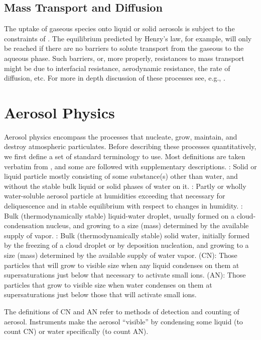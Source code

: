 \documentclass[12pt,twoside]{book}
\begin{document}
\section{Mass Transport and Diffusion}
The uptake of gaseous species onto liquid or solid aerosols is subject
to the constraints of .
The equilibrium predicted by Henry's law, for example, will only be
reached if there are no barriers to solute transport from the gaseous
to the aqueous phase. 
Such barriers, or, more properly, resistances to mass transport might
be due to interfacial resistance, aerodynamic resistance, the rate
of diffusion, etc.
For more in depth discussion of these processes see, e.g.,
\cite{Sch86,LeC91,SeP97,JPL97}. 

\chapter{Aerosol Physics}\label{sxn:aer}
Aerosol physics encompass the processes that nucleate, grow, maintain,
and destroy atmospheric particulates.
Before describing these processes quantitatively, we first define 
a set of standard terminology to use.
Most definitions are taken verbatim from \cite{Val85}, and some are
followed with supplementary descriptions.
: Solid or liquid particle mostly
consisting of some substance(s) other than water, and without the
stable bulk liquid or solid phases of water on it.
: Partly or wholly water-soluble aerosol
particle at humidities exceeding that necessary for deliquescence and
in stable equilibrium with respect to changes in humidity.
: Bulk (thermodynamically stable) liquid-water
droplet, usually formed on a cloud-condensation nucleus, and growing
to a size (mass) determined by the available supply of vapor.
: Bulk (thermodynamically stable) solid water,
initially formed by the freezing of a cloud droplet or by deposition
nucleation, and growing to a size (mass) determined by the available
supply of water vapor.
 (CN): Those particles that will grow to
visible size when any liquid condenses on them at supersaturations
just below that necessary to activate small ions.
 (AN): Those particles that grow to visible size
when water condenses on them at supersaturations just below those that
will activate small ions.

The definitions of CN and AN refer to methods of detection and
counting of aerosol.
Instruments make the aerosol ``visible'' by condensing some liquid
(to count CN) or water specifically (to count AN).
\end{document}
